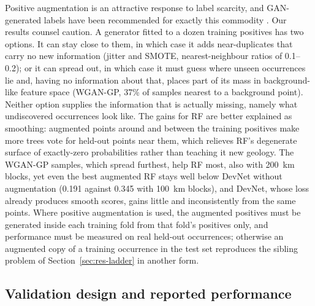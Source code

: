 \documentclass[pdflatex,sn-apa]{sn-jnl}
\begin{document}
Positive augmentation is an attractive response to label scarcity, and GAN-generated labels have been recommended for exactly this commodity \citep{Parsa2025}. Our results counsel caution. A generator fitted to a dozen training positives has two options. It can stay close to them, in which case it adds near-duplicates that carry no new information (jitter and SMOTE, nearest-neighbour ratios of 0.1--0.2); or it can spread out, in which case it must guess where unseen occurrences lie and, having no information about that, places part of its mass in background-like feature space (WGAN-GP, 37\% of samples nearest to a background point). Neither option supplies the information that is actually missing, namely what undiscovered occurrences look like. The gains for RF are better explained as smoothing: augmented points around and between the training positives make more trees vote for held-out points near them, which relieves RF's degenerate surface of exactly-zero probabilities rather than teaching it new geology. The WGAN-GP samples, which spread furthest, help RF most, also with 200~km blocks, yet even the best augmented RF stays well below DevNet without augmentation (0.191 against 0.345 with 100~km blocks), and DevNet, whose loss already produces smooth scores, gains little and inconsistently from the same points. Where positive augmentation is used, the augmented positives must be generated inside each training fold from that fold's positives only, and performance must be measured on real held-out occurrences; otherwise an augmented copy of a training occurrence in the test set reproduces the sibling problem of Section~\ref{sec:res-ladder} in another form.

\subsection{Validation design and reported performance}\label{sec:disc-protocol}
\end{document}
